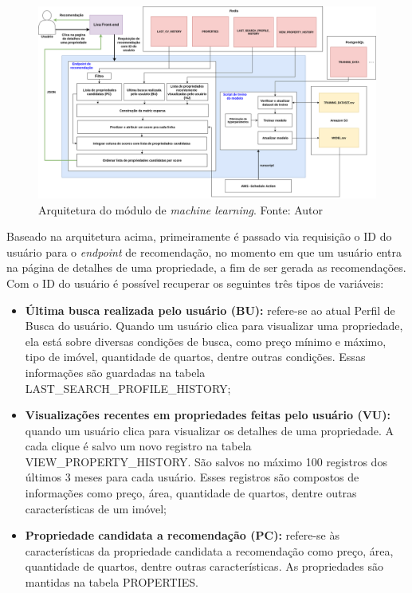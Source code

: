 \begin{figure}
    \centering
    \includegraphics[scale=0.4]{figuras/proposta/sr_nivel3.png}
    \caption[Arquitetura do módulo de \textit{machine learning}]{Arquitetura do módulo de \textit{machine learning}. Fonte: Autor}
    \label{fig:sr_nivel3}
\end{figure}

Baseado na arquitetura acima, primeiramente é passado via requisição o ID do usuário para o \textit{endpoint} de recomendação, no momento em que um usuário entra na página de detalhes de uma propriedade, a fim de ser gerada as recomendações. Com o ID do usuário é possível recuperar os seguintes três tipos de variáveis:

\begin{itemize}
    \item \textbf{Última busca realizada pelo usuário (BU):} refere-se ao atual Perfil de Busca do usuário. Quando um usuário clica para visualizar uma propriedade, ela está sobre diversas condições de busca, como preço mínimo e máximo, tipo de imóvel, quantidade de quartos, dentre outras condições. Essas informações são guardadas na tabela LAST\_SEARCH\_PROFILE\_HISTORY;

    \item \textbf{Visualizações recentes em propriedades feitas pelo usuário (VU):} quando um usuário clica para visualizar os detalhes de uma propriedade. A cada clique é salvo um novo registro na tabela VIEW\_PROPERTY\_HISTORY. São salvos no máximo 100 registros dos últimos 3 meses para cada usuário. Esses registros são compostos de informações como preço, área, quantidade de quartos, dentre outras características de um imóvel;

    \item \textbf{Propriedade candidata a recomendação (PC):} refere-se às características da propriedade candidata a recomendação como preço, área, quantidade de quartos, dentre outras características. As propriedades são mantidas na tabela PROPERTIES.
\end{itemize}

